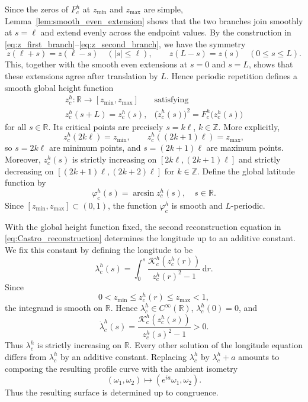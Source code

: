 \documentclass[a4paper,11pt]{amsart}
\numberwithin{equation}{section}
\theoremstyle{plain}
\newcommand{\dif}{\mathrm{d}}
\begin{document}
Since the zeros of $F_c^h$ at $z_{\min}$ and $z_{\max}$ are simple,
Lemma~\ref{lem:smooth_even_extension} shows that the two branches join
smoothly at $s=\ell$ and extend evenly across the endpoint values. By the construction in
\eqref{eq:z_first_branch}--\eqref{eq:z_second_branch}, we have the symmetry
\begin{equation}\label{eq:z_symmetry}
z(\ell+s)=z(\ell-s)\quad (|s|\leq\ell),
\qquad
z(L-s)=z(s)\quad (0\leq s\leq L).
\end{equation}
This, together with the smooth even extensions
at $s=0$ and $s=L$, shows that these extensions agree after translation
by $L$. Hence periodic repetition defines a smooth global height function
\begin{equation}\label{eq:z_periodic_global}
\begin{array}{cc}
 z_c^h:\mathbb R\longrightarrow[z_{\min},z_{\max}] & \text{satisfying} \\
  z_c^h(s+L)=z_c^h(s), & \bigl(\dot z_c^h(s)\bigr)^2=F_c^h\bigl(z_c^h(s)\bigr) 
\end{array}
\end{equation}
for all $s\in\mathbb R$.
Its critical points are precisely $s=k\ell$, $k\in\mathbb Z$. More
explicitly,
\[
z_c^h(2k\ell)=z_{\min},
\qquad
z_c^h((2k+1)\ell)=z_{\max},
\]
so $s=2k\ell$ are minimum points, and
$s=(2k+1)\ell$ are maximum points. Moreover, $z_c^h(s)$ is strictly increasing on $[2k\ell, (2k+1)\ell]$ and strictly decreasing on $[(2k+1)\ell, (2k+2)\ell]$ for $k\in\mathbb Z$.
Define the global latitude function by
\begin{equation}\label{eq:varphi_definition}
\varphi_c^h(s)=\arcsin z_c^h(s), \quad s\in\mathbb{R}.
\end{equation}
Since $[z_{\min},z_{\max}]\subset(0,1)$, the function
$\varphi_c^h$ is smooth and $L$-periodic.

With the global height function fixed, the second reconstruction equation in
\eqref{eq:Castro_reconstruction} determines the longitude up to an additive
constant. We fix this constant by defining the longitude to be 
\begin{equation}\label{eq:lambda_integral}
\lambda_c^h(s)
=
\int_0^s
\frac{\mathcal K_c^h(z_c^h(r))}{z_c^h(r)^2-1}\,\dif r.
\end{equation}
Since
\[
0<z_{\min}\le z_c^h(r)\le z_{\max}<1,
\]
the integrand is smooth on $\mathbb R$. Hence
$\lambda_c^h\in C^\infty(\mathbb R)$,
$\lambda_c^h(0)=0$, and
\begin{equation}\label{eq:lambda_derivative}
\dot\lambda_c^h(s)
=
\frac{\mathcal K_c^h(z_c^h(s))}{z_c^h(s)^2-1}
>0.
\end{equation}
Thus $\lambda_c^h$ is strictly increasing on $\mathbb R$.
Every other solution of the longitude equation differs from
$\lambda_c^h$ by an additive constant. Replacing $\lambda_c^h$ by
$\lambda_c^h+a$ amounts to composing the resulting profile curve with the
ambient isometry
\[
(\omega_1,\omega_2)\longmapsto(e^{ia}\omega_1,\omega_2).
\]
Thus the resulting surface is determined up to congruence.
\end{document}
